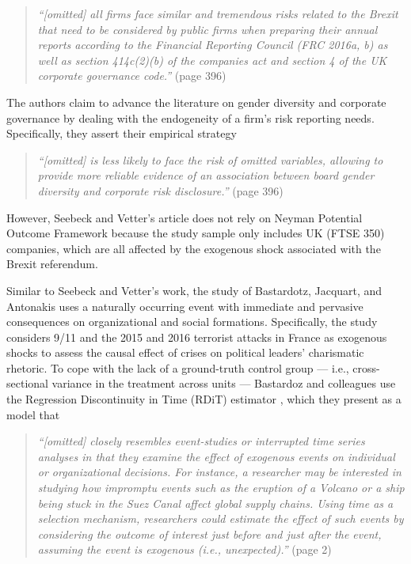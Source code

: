\documentclass[11pt]{article}
\begin{document}
\begin{refsection}
\begin{quote}
  \textit{
    ``[omitted] all firms face similar and tremendous risks related to the Brexit that
    need to be considered by public firms when preparing their annual reports
    according to the Financial Reporting Council (FRC 2016a, b) as well as
    section 414c(2)(b) of the companies act and section 4 of the UK corporate
    governance code.''
  }
  (page 396)
\end{quote}

The authors claim to advance the literature on gender diversity and corporate governance by dealing with the endogeneity of a firm's risk reporting needs. Specifically, they assert their empirical strategy

\begin{quote}
  \textit{
    ``[omitted] is less likely to face the risk of omitted variables, allowing to provide
    more reliable evidence of an association between board gender diversity and
    corporate risk disclosure.''
  }
  (page 396)
\end{quote}

However, Seebeck and Vetter's article does not rely on Neyman Potential Outcome Framework because the study sample only includes UK (FTSE 350) companies, which are all affected by the exogenous shock associated with the Brexit referendum. 

Similar to Seebeck and Vetter's work, the study of Bastardotz, Jacquart, and  Antonakis \autocite*{bastardoz2022} uses a naturally occurring event with immediate and pervasive consequences on organizational and social formations.  Specifically, the study considers 9/11  and the 2015 and 2016 terrorist attacks in France as exogenous shocks to assess the causal effect of crises on political leaders' charismatic rhetoric. To cope with the lack of a ground-truth  control group --- i.e., cross-sectional variance in the treatment across units  ---  Bastardoz and colleagues use the Regression Discontinuity in Time (RDiT) estimator  \autocite{hausman_rapson_2018}, which they present as a model that

\begin{quote}
  \textit{
    ``[omitted] closely resembles event-studies or interrupted time series
    analyses in that they examine the effect of exogenous events on
    individual or organizational decisions. For instance, a researcher
    may be interested in studying how impromptu events such as the
    eruption of a Volcano or a ship being stuck in the Suez Canal affect
    global supply chains. Using time as a selection mechanism, researchers 
    could estimate the effect of such events by considering the outcome of 
    interest just before and just after the event, assuming the
    event is exogenous (i.e., unexpected).''
  }
  (page 2)
\end{quote}


\end{refsection}
\end{document}
